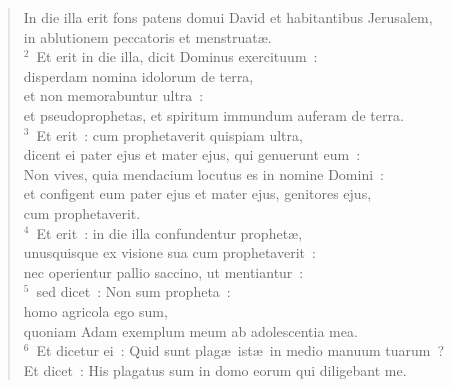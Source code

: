 \begin{flushleft}\begin{verse}\vspace{-19pt}\hspace{6pt}In die illa erit fons patens domui David et habitantibus Jerusalem,\\\hspace{6pt} in ablutionem peccatoris et menstruat\ae .\\
${}^{2}$~Et erit in die illa, dicit Dominus exercituum~:\\ disperdam nomina idolorum de terra,\\ et non memorabuntur ultra~:\\ et pseudoprophetas, et spiritum immundum auferam de terra.\\
${}^{3}$~Et erit~: cum prophetaverit quispiam ultra,\\ dicent ei pater ejus et mater ejus, qui genuerunt eum~:\\ Non vives, quia mendacium locutus es in nomine Domini~:\\ et configent eum pater ejus et mater ejus, genitores ejus,\\ cum prophetaverit.\\
${}^{4}$~Et erit~: in die illa confundentur prophet\ae ,\\ unusquisque ex visione sua cum prophetaverit~:\\ nec operientur pallio saccino, ut mentiantur~:\\
${}^{5}$~sed dicet~: Non sum propheta~:\\ homo agricola ego sum,\\ quoniam Adam exemplum meum ab adolescentia mea.\\
${}^{6}$~Et dicetur ei~: Quid sunt plag\ae\ ist\ae\ in medio manuum tuarum~?\\ Et dicet~: His plagatus sum in domo eorum qui diligebant me.\end{verse}\end{flushleft}


